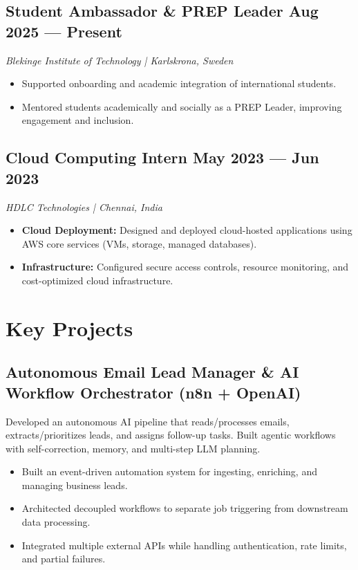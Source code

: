 \documentclass[11pt, a4paper]{article}
\begin{document}
\subsection*{Student Ambassador \& PREP Leader \hfill Aug 2025 --- Present}
\textit{Blekinge Institute of Technology | Karlskrona, Sweden}
\begin{itemize}
    \item Supported onboarding and academic integration of international students.
    \item Mentored students academically and socially as a PREP Leader, improving engagement and inclusion.
\end{itemize}

\subsection*{Cloud Computing Intern \hfill May 2023 --- Jun 2023}
\textit{HDLC Technologies | Chennai, India}
\begin{itemize}
    \item \textbf{Cloud Deployment:} Designed and deployed cloud-hosted applications using AWS core services (VMs, storage, managed databases).
    \item \textbf{Infrastructure:} Configured secure access controls, resource monitoring, and cost-optimized cloud infrastructure.
\end{itemize}

\section*{Key Projects}

\subsection*{Autonomous Email Lead Manager \& AI Workflow Orchestrator (n8n + OpenAI)}
Developed an autonomous AI pipeline that reads/processes emails, extracts/prioritizes leads, and assigns follow-up tasks. Built agentic workflows with self-correction, memory, and multi-step LLM planning.
\begin{itemize}
    \item Built an event-driven automation system for ingesting, enriching, and managing business leads.
    \item Architected decoupled workflows to separate job triggering from downstream data processing.
    \item Integrated multiple external APIs while handling authentication, rate limits, and partial failures.
\end{itemize}
\end{document}

